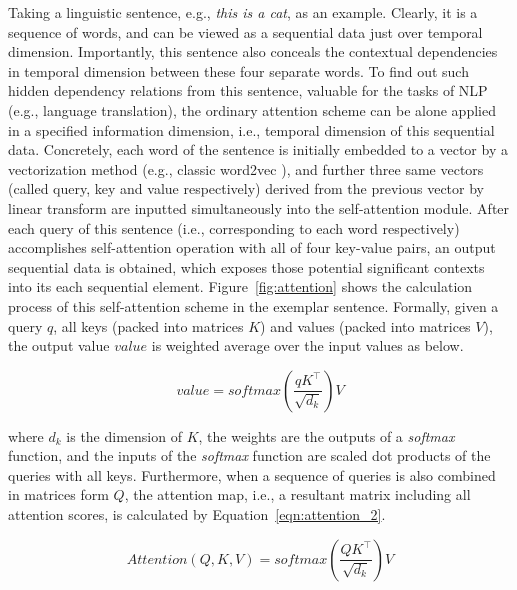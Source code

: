Taking a linguistic sentence, e.g., \textit{this is a cat}, as an example. Clearly, it is a sequence of words, and can be viewed as a sequential data just over temporal dimension. Importantly, this sentence also conceals the contextual dependencies in temporal dimension between these four separate words. To find out such hidden dependency relations from this sentence, valuable for the tasks of NLP (e.g., language translation), the ordinary attention scheme can be alone applied in a specified information dimension, i.e., temporal dimension of this sequential data. Concretely, each word of the sentence is initially embedded to a vector by a vectorization method (e.g., classic word2vec \cite{church2017word2vec}), and further three same vectors (called query, key and value respectively) derived from the previous vector by linear transform are inputted simultaneously into the self-attention module. After each query of this sentence (i.e., corresponding to each word respectively) accomplishes self-attention operation with all of four key-value pairs, an output sequential data is obtained, which exposes those potential significant contexts into its each sequential element. Figure~\ref{fig:attention} shows the calculation process of this self-attention scheme in the exemplar sentence. Formally, given a query $q$, all keys (packed into matrices $K$) and values (packed into matrices $V$), the output value $value$ is weighted average over the input values as below.

\begin{equation}
    \label{eqn:attention_1}
    value = softmax(\frac{q K^\top}{\sqrt{d_k}}) V
\end{equation}

where $d_k$ is the dimension of $K$, the weights are the outputs of a \textit{softmax} function, and the inputs of the \textit{softmax} function are scaled dot products of the queries with all keys. Furthermore, when a sequence of queries is also combined in matrices form $Q$, the attention map, i.e., a resultant matrix including all attention scores, is calculated by Equation~\ref{eqn:attention_2}.

\begin{equation}
    \label{eqn:attention_2}
    Attention(Q,K,V) = softmax(\frac{Q K^\top}{\sqrt{d_k}}) V
\end{equation}

